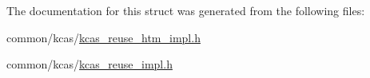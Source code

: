 The documentation for this struct was generated from the following files\+:\begin{DoxyCompactItemize}
\item 
common/kcas/\hyperlink{kcas__reuse__htm__impl_8h}{kcas\+\_\+reuse\+\_\+htm\+\_\+impl.\+h}\item 
common/kcas/\hyperlink{kcas__reuse__impl_8h}{kcas\+\_\+reuse\+\_\+impl.\+h}\end{DoxyCompactItemize}
